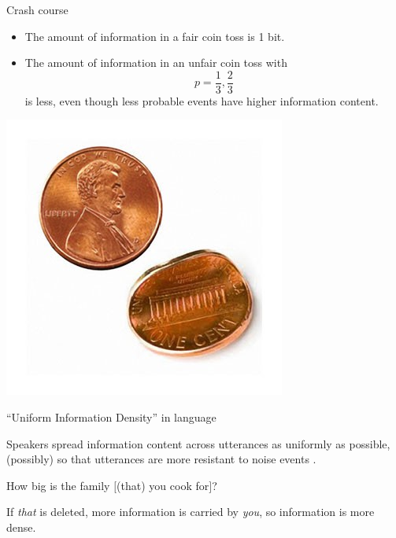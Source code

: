 \documentclass[hyperref={pdfpagelabels=false}]{beamer}
\begin{document}
\begin{frame}{Crash course} 
\begin{itemize}
	\item The amount of information in a fair coin toss is 1 bit.
	\item The amount of information in an unfair coin toss with $$p = \frac{1}{3}, \frac{2}{3}$$ is less, even though less probable events have higher information content.
\end{itemize}
\begin{center}
	\includegraphics[scale=0.4]{bentcoin.jpg}
\end{center}
\end{frame}





\begin{frame}{``Uniform Information Density'' in language} 
\begin{center}
	Speakers spread information content across utterances as uniformly as possible, (possibly) so that utterances are more resistant to noise events \small{\citep{aylettturk2004,levyjaeger2007,levy2008a}}.
\end{center}
\begin{exe}
	\ex How big is the family $[$(that) you cook for$]$?
\end{exe}

\begin{center}
	If \textsl{that} is deleted, more information is carried by \textsl{you}, so information is more dense.
\end{center}


\end{frame}
\end{document}
